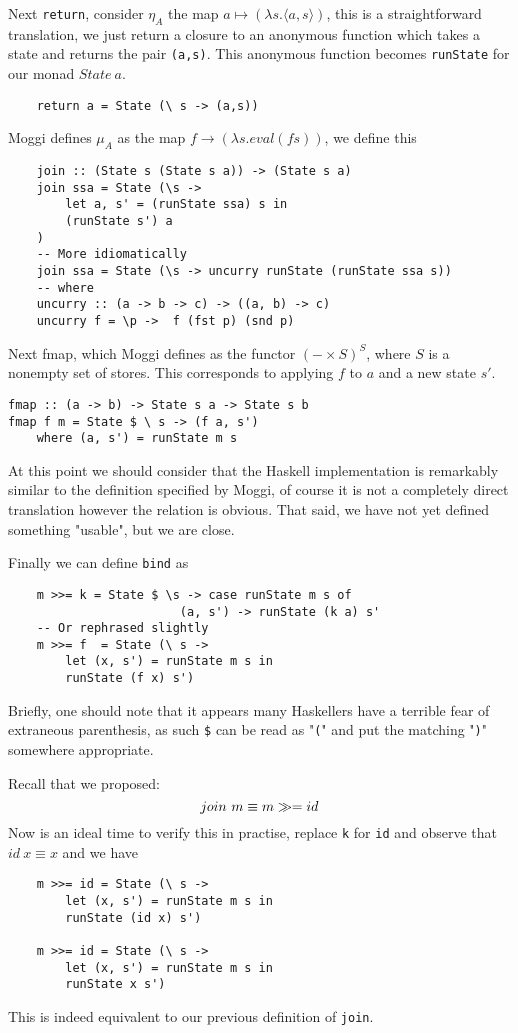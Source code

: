 Next \texttt{return},
consider $\eta_A$ the map $a \mapsto (\lambda s.\langle a,s \rangle)$,
this is a straightforward translation,
we just return a closure to an anonymous function
which takes a state and returns the pair \texttt{(a,s)}.
This anonymous function becomes \texttt{runState} for our
monad $State\ a$.
\begin{verbatim}
    return a = State (\ s -> (a,s))
\end{verbatim}

Moggi defines $\mu_A$ as the map $f \rightarrow (\lambda s.eval(fs))$,
we define this
\begin{verbatim}
    join :: (State s (State s a)) -> (State s a)
    join ssa = State (\s ->
        let a, s' = (runState ssa) s in
        (runState s') a
    )
    -- More idiomatically
    join ssa = State (\s -> uncurry runState (runState ssa s))
    -- where
    uncurry :: (a -> b -> c) -> ((a, b) -> c)
    uncurry f = \p ->  f (fst p) (snd p)
\end{verbatim}

Next fmap, which Moggi defines as
the functor $(-\times S)^S$,
where $S$ is a nonempty set of stores.
This corresponds to applying $f$ to $a$ and
a new state $s\prime$.
\begin{verbatim}
fmap :: (a -> b) -> State s a -> State s b
fmap f m = State $ \ s -> (f a, s')
    where (a, s') = runState m s
\end{verbatim}

At this point we should consider
that the Haskell implementation is remarkably
similar to the definition specified by Moggi,
of course it is not a completely direct translation
however the relation is obvious.
That said, we have not yet defined something "usable",
but we are close.

Finally we can define \texttt{bind} as
\begin{verbatim}
    m >>= k = State $ \s -> case runState m s of
                        (a, s') -> runState (k a) s'
    -- Or rephrased slightly
    m >>= f  = State (\ s ->
        let (x, s') = runState m s in
        runState (f x) s')
\end{verbatim}

Briefly, one should note that it appears many Haskellers
have a terrible fear of extraneous parenthesis,
as such \texttt{\$} can be read as "\texttt{(}"
and put the matching "\texttt{)}" somewhere appropriate.

Recall that we proposed:
\begin{equation}
    join\ m \equiv m \gg= id
\end{equation}
Now is an ideal time to verify this in practise,
replace \texttt{k} for \texttt{id} and
observe that $id\ x \equiv x$ and we have
\begin{verbatim}
    m >>= id = State (\ s ->
        let (x, s') = runState m s in
        runState (id x) s')

    m >>= id = State (\ s ->
        let (x, s') = runState m s in
        runState x s')
\end{verbatim}
This is indeed equivalent to our previous
definition of \texttt{join}.

